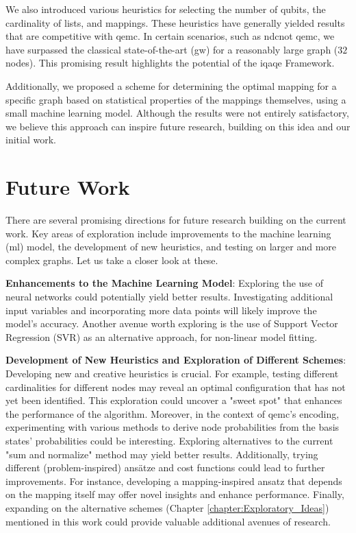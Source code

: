 We also introduced various heuristics for selecting the number of qubits, the cardinality of lists, and mappings. These heuristics have generally yielded results that are competitive with \acrshort{qemc}. In certain scenarios, such as \acrshort{ndcnot} \acrshort{qemc}, we have surpassed the classical state-of-the-art (\acrshort{gw}) for a reasonably large graph ($32$ nodes). This promising result highlights the potential of the \acrshort{iqaqe} Framework. %

Additionally, we proposed a scheme for determining the optimal mapping for a specific graph based on statistical properties of the mappings themselves, using a small machine learning model. Although the results were not entirely satisfactory, we believe this approach can inspire future research, building on this idea and our initial work. %


\section{Future Work}
\label{section:future}
There are several promising directions for future research building on the current work. Key areas of exploration include improvements to the machine learning (\acrshort{ml}) model, the development of new heuristics, and testing on larger and more complex graphs. Let us take a closer look at these.
\vspace{5mm}

\noindent\textbf{Enhancements to the Machine Learning Model}: %
\noindent Exploring the use of neural networks could potentially yield better results. Investigating additional input variables and incorporating more data points will likely improve the model's accuracy. Another avenue worth exploring is the use of Support Vector Regression (SVR) as an alternative approach, for non-linear model fitting.
\vspace{5mm}

\noindent\textbf{Development of New Heuristics and Exploration of Different Schemes}: Developing new and creative heuristics is crucial. For example, testing different cardinalities for different nodes may reveal an optimal configuration that has not yet been identified. This exploration could uncover a "sweet spot" that enhances the performance of the algorithm. Moreover, in the context of \acrshort{qemc}'s encoding, experimenting with various methods to derive node probabilities from the basis states' probabilities could be interesting. Exploring alternatives to the current "sum and normalize" method may yield better results. Additionally, trying different (problem-inspired) ansätze and cost functions could lead to further improvements. For instance, developing a mapping-inspired ansatz that depends on the mapping itself may offer novel insights and enhance performance. Finally, expanding on the alternative schemes (Chapter \ref{chapter:Exploratory_Ideas}) mentioned in this work could provide valuable additional avenues of research.
\vspace{5mm}

